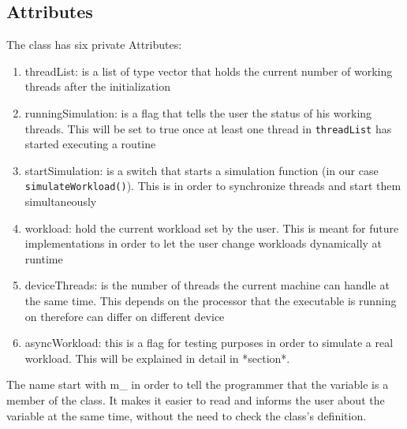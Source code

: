 \subsection{Attributes}
The class has six private Attributes:
\begin{enumerate}
	\item threadList: is a list of type vector that holds the current number of working threads after the initialization
	\item runningSimulation: is a flag that tells the user the status of his working threads. This will be set to true once at least one thread in \texttt{threadList} has started executing a routine
	\item startSimulation: is a switch that starts a simulation function (in our case \texttt{simulateWorkload()}). This is in order to synchronize threads and start them simultaneously
	\item workload: hold the current workload set by the user. This is meant for future implementations in order to let the user change workloads dynamically at runtime
	\item deviceThreads: is the number of threads the current machine can handle at the same time. This depends on the processor that the executable is running on therefore can differ on different device
	\item asyncWorkload: this is a flag for testing purposes in order to simulate a \dq real\dq{} workload. This will be explained in detail in *section*.
\end{enumerate}
The name start with \dq m\_\dq{} in order to tell the programmer that the variable is a member of the class. It makes it easier to read and informs the user about the variable at the same time, without the need to check the class's definition.

